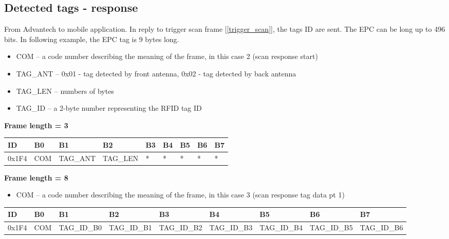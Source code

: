\documentclass{article}
\begin{document}
\subsection{Detected tags - response}
From Advantech to mobile application. In reply to trigger scan frame [\ref{trigger_scan}], the tags ID are sent. The EPC can be long up to 496 bits. In following example, the EPC tag is 9 bytes long.

\begin{itemize}
    \item COM -- a code number describing the meaning of the frame, in this case 2 (scan response start)
    \item TAG\_ANT -- 0x01 - tag detected by front antenna, 0x02 - tag detected by back antenna
    \item TAG\_LEN -- numbers of bytes
    \item TAG\_ID -- a 2-byte number representing the RFID tag ID
\end{itemize}{}

\textbf{Frame length = 3}
\begin{center}
    \begin{tabular}{| p{20pt} | p{45pt} | p{55pt} | p{55pt} | p{55pt} | p{55pt} | p{40pt} | p{40pt} | p{40pt} |}
        \hline
        ID    & B0  & B1       & B2       & B3 & B4 & B5 & B6 & B7 \\
        \hline
        0x1F4 & COM & TAG\_ANT & TAG\_LEN & *  & *  & *  & *  & *  \\
        \hline
    \end{tabular}
\end{center}

\textbf{Frame length = 8}

\begin{itemize}
    \item COM -- a code number describing the meaning of the frame, in this case 3 (scan response tag data pt 1)
\end{itemize}

\begin{center}
    \begin{tabular}{| p{20pt} | p{20pt} | p{50pt} | p{50pt} | p{50pt} | p{50pt} | p{50pt} | p{50pt} | p{50pt} |}
        \hline
        ID    & B0  & B1          & B2          & B3          & B4          & B5          & B6          & B7          \\
        \hline
        0x1F4 & COM & TAG\_ID\_B0 & TAG\_ID\_B1 & TAG\_ID\_B2 & TAG\_ID\_B3 & TAG\_ID\_B4 & TAG\_ID\_B5 & TAG\_ID\_B6 \\
        \hline
    \end{tabular}
\end{center}
\end{document}
